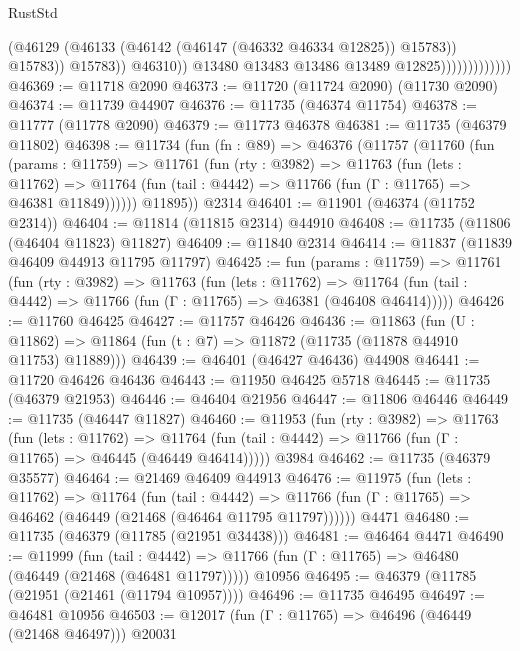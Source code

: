 \begin{lexlean}{RustStd}
\begin{coremodule}
                                        (@46129
                                          (@46133 (@46142 (@46147 (@46332 @46334 @12825)) @15783))
                                          @15783))
                                      @15783))
                                  @46310))
                              @13480
                              @13483
                              @13486
                              @13489
                              @12825)))))))))))))
@46369 := @11718 @2090
@46373 := @11720 (@11724 @2090) (@11730 @2090)
@46374 := @11739 @44907
@46376 := @11735 (@46374 @11754)
@46378 := @11777 (@11778 @2090)
@46379 := @11773 @46378
@46381 := @11735 (@46379 @11802)
@46398 := @11734
    (fun (fn : @89) =>
    @46376
      (@11757
        (@11760
          (fun (params : @11759) =>
          @11761
            (fun (rty : @3982) =>
            @11763
              (fun (lets : @11762) =>
              @11764 (fun (tail : @4442) => @11766 (fun (Γ : @11765) => @46381 @11849))))))
        @11895))
    @2314
@46401 := @11901 (@46374 (@11752 @2314))
@46404 := @11814 (@11815 @2314) @44910
@46408 := @11735 (@11806 (@46404 @11823) @11827)
@46409 := @11840 @2314
@46414 := @11837 (@11839 @46409 @44913 @11795 @11797)
@46425 := fun (params : @11759) =>
  @11761
    (fun (rty : @3982) =>
    @11763
      (fun (lets : @11762) =>
      @11764 (fun (tail : @4442) => @11766 (fun (Γ : @11765) => @46381 (@46408 @46414)))))
@46426 := @11760 @46425
@46427 := @11757 @46426
@46436 := @11863
    (fun (U : @11862) => @11864 (fun (t : @7) => @11872 (@11735 (@11878 @44910 @11753) @11889)))
@46439 := @46401 (@46427 @46436) @44908
@46441 := @11720 @46426 @46436
@46443 := @11950 @46425 @5718
@46445 := @11735 (@46379 @21953)
@46446 := @46404 @21956
@46447 := @11806 @46446
@46449 := @11735 (@46447 @11827)
@46460 := @11953
    (fun (rty : @3982) =>
    @11763
      (fun (lets : @11762) =>
      @11764 (fun (tail : @4442) => @11766 (fun (Γ : @11765) => @46445 (@46449 @46414)))))
    @3984
@46462 := @11735 (@46379 @35577)
@46464 := @21469 @46409 @44913
@46476 := @11975
    (fun (lets : @11762) =>
    @11764
      (fun (tail : @4442) =>
      @11766 (fun (Γ : @11765) => @46462 (@46449 (@21468 (@46464 @11795 @11797))))))
    @4471
@46480 := @11735 (@46379 (@11785 (@21951 @34438)))
@46481 := @46464 @4471
@46490 := @11999
    (fun (tail : @4442) => @11766 (fun (Γ : @11765) => @46480 (@46449 (@21468 (@46481 @11797)))))
    @10956
@46495 := @46379 (@11785 (@21951 (@21461 (@11794 @10957))))
@46496 := @11735 @46495
@46497 := @46481 @10956
@46503 := @12017 (fun (Γ : @11765) => @46496 (@46449 (@21468 @46497))) @20031

\end{coremodule}
\end{lexlean}

